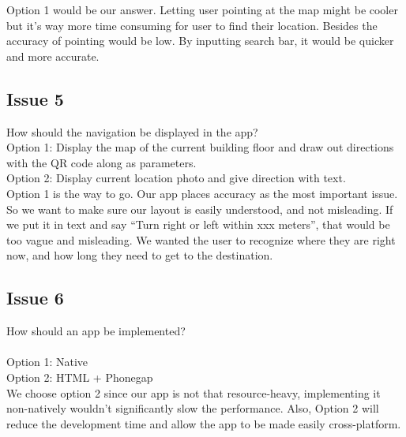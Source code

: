 \documentclass[12pt]{article}
\begin{document}
Option 1 would be our answer. Letting user pointing at the map might be cooler but it’s way more time consuming for user to find their location. Besides the accuracy of pointing would be low. By inputting search bar, it would be quicker and more accurate. 

\subsection{Issue 5}
How should the navigation be displayed in the app? \\

Option 1: Display the map of the current building floor and draw out directions with the QR code along as parameters. \\
Option 2: Display current location photo and give direction with text. \\

Option 1 is the way to go.  Our app places accuracy as the most important issue. So we want to make sure our layout is easily understood, and not misleading. If we put it in text and say “Turn right or left within xxx meters”, that would be too vague and misleading. We wanted the user to recognize where they are right now, and how long they need to get to the destination.


\subsection{Issue 6}
How should an app be implemented?  \\ \\
Option 1: Native  \\
Option 2: HTML + Phonegap \\

We choose option 2 since our app is not that resource-heavy, implementing it non-natively wouldn’t significantly slow the performance. Also, Option 2 will reduce the development time and allow the app to be made easily cross-platform.
\end{document}
